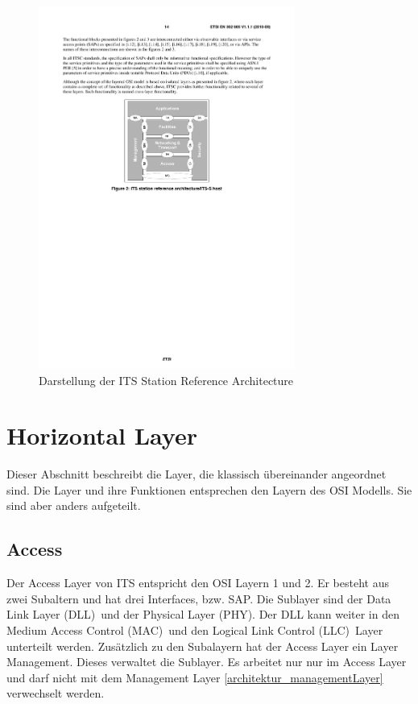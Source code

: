 \begin{figure}
	\includegraphics[width=0.75\textwidth]{content/images/02_architektur/stationReferenceArchitecture.pdf}
	\caption{Darstellung der ITS Station Reference Architecture \cite{etsi2010302}}
	\label{fig:funktionsweise_referenceArchitecture}
\end{figure}

\section{Horizontal Layer}
Dieser Abschnitt beschreibt die Layer, die klassisch übereinander angeordnet sind. Die Layer und ihre Funktionen entsprechen den Layern des \ac{OSI} Modells. Sie sind aber anders aufgeteilt.

\subsection{Access}
Der Access Layer von ITS entspricht den \ac{OSI} Layern 1 und 2. Er besteht aus zwei Subaltern und hat drei Interfaces, bzw. \ac{SAP}. Die Sublayer sind der \glqq Data Link Layer (DLL)\grqq~und der \glqq Physical Layer (PHY)\grqq. Der DLL kann weiter in den \glqq Medium Access Control (MAC)\grqq~und den \glqq Logical Link Control (LLC)\grqq~Layer unterteilt werden. Zusätzlich zu den Subalayern hat der Access Layer ein Layer Management. Dieses verwaltet die Sublayer. Es arbeitet nur nur im Access Layer und darf nicht mit dem  Management Layer \ref{architektur_managementLayer} verwechselt werden.

